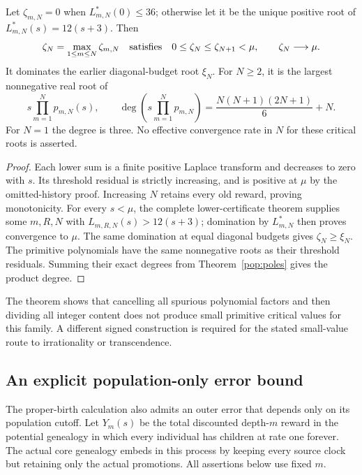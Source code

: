 \begin{corollary}
\label{pop:roots}
Let $\zeta_{m,N}=0$ when $L^*_{m,N}(0)\le36$; otherwise let it
be the unique positive root of $L^*_{m,N}(s)=12(s+3)$. Then
\[
 \zeta_N=\max_{1\le m\le N}\zeta_{m,N}
 \quad\hbox{satisfies}\quad
 0\le\zeta_N\le\zeta_{N+1}<\mu,\qquad
 \zeta_N\longrightarrow\mu.
\]
It dominates the earlier diagonal-budget root $\xi_N$.
For $N\ge2$, it is the largest nonnegative real root of
\[
 s\prod_{m=1}^N p_{m,N}(s),
 \qquad
 \deg\left(s\prod_{m=1}^N p_{m,N}\right)
 =\frac{N(N+1)(2N+1)}6+N.
\]
For $N=1$ the degree is three. No effective convergence rate in $N$
for these critical roots is asserted.
\end{corollary}
\begin{proof}
Each lower sum is a finite positive Laplace transform and decreases
to zero with $s$. Its threshold residual is strictly increasing, and
is positive at $\mu$ by the omitted-history proof. Increasing $N$
retains every old reward, proving monotonicity. For every $s<\mu$,
the complete lower-certificate theorem supplies some $m,R,N$ with
$L_{m,R,N}(s)>12(s+3)$; domination by $L^*_{m,N}$ then proves
convergence to $\mu$. The same domination at equal diagonal budgets
gives $\zeta_N\ge\xi_N$. The primitive polynomials have the same
nonnegative roots as their threshold residuals. Summing their exact
degrees from Theorem~\ref{pop:poles} gives the product degree.
\end{proof}

The theorem shows that cancelling all spurious polynomial factors and
then dividing all integer content does not produce small primitive
critical values for this family. A different signed construction is
required for the stated small-value route to irrationality or transcendence.

\subsection{An explicit population-only error bound}
\label{pop:tail-section}

The proper-birth calculation also admits an outer error that depends
only on its population cutoff. Let $Y_m(s)$ be the total discounted
depth-$m$ reward in the potential genealogy in which every individual
has children at rate one forever. The actual core genealogy embeds
in this process by keeping every source clock but retaining only the
actual promotions. All assertions below use fixed $m$.

